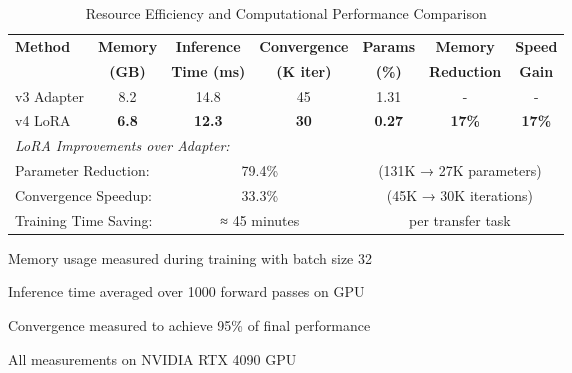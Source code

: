\begin{table}[t]
\centering
\caption{Resource Efficiency and Computational Performance Comparison}
\label{tab:efficiency}
\begin{tabular}{lcccccc}
\toprule
\textbf{Method} & \textbf{Memory} & \textbf{Inference} & \textbf{Convergence} & \textbf{Params} & \textbf{Memory} & \textbf{Speed} \\
 & \textbf{(GB)} & \textbf{Time (ms)} & \textbf{(K iter)} & \textbf{(\%)} & \textbf{Reduction} & \textbf{Gain} \\
\midrule
v3 Adapter & 8.2 & 14.8 & 45 & 1.31 & - & - \\
v4 LoRA & \textbf{6.8} & \textbf{12.3} & \textbf{30} & \textbf{0.27} & \textbf{17\%} & \textbf{17\%} \\
\midrule
\multicolumn{7}{l}{\textit{LoRA Improvements over Adapter:}} \\
\multicolumn{2}{l}{Parameter Reduction:} & \multicolumn{2}{c}{79.4\%} & \multicolumn{3}{c}{(131K → 27K parameters)} \\
\multicolumn{2}{l}{Convergence Speedup:} & \multicolumn{2}{c}{33.3\%} & \multicolumn{3}{c}{(45K → 30K iterations)} \\
\multicolumn{2}{l}{Training Time Saving:} & \multicolumn{2}{c}{≈ 45 minutes} & \multicolumn{3}{c}{per transfer task} \\
\bottomrule
\end{tabular}
\begin{tablenotes}
\small
\item Memory usage measured during training with batch size 32
\item Inference time averaged over 1000 forward passes on GPU
\item Convergence measured to achieve 95\% of final performance
\item All measurements on NVIDIA RTX 4090 GPU
\end{tablenotes}
\end{table}